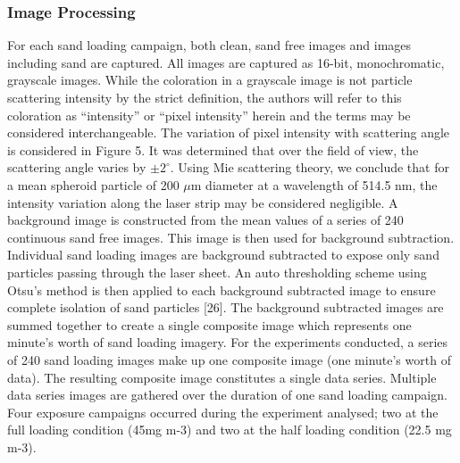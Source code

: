 \documentclass[12pt]{iopart}
\begin{document}
\subsubsection{Image Processing}
For each sand loading campaign, both clean, sand free images and images including sand are captured. All images are captured as 16-bit, monochromatic, grayscale images. While the coloration in a grayscale image is not particle scattering intensity by the strict definition, the authors will refer to this coloration as “intensity” or “pixel intensity” herein and the terms may be considered interchangeable. The variation of pixel intensity with scattering angle is considered in Figure 5. It was determined that over the field of view, the scattering angle varies by $\pm2^\circ$. Using Mie scattering theory, we conclude that for a mean spheroid particle of 200 $\mu$m diameter at a wavelength of 514.5 nm, the intensity variation along the laser strip may be considered negligible.
A background image is constructed from the mean values of a series of 240 continuous sand free images. This image is then used for background subtraction. Individual sand loading images are background subtracted to expose only sand particles passing through the laser sheet. An auto thresholding scheme using Otsu’s method is then applied to each background subtracted image to ensure complete isolation of sand particles [26]. The background subtracted images are summed together to create a single composite image which represents one minute’s worth of sand loading imagery. For the experiments conducted, a series of 240 sand loading images make up one composite image (one minute’s worth of data). The resulting composite image constitutes a single data series. Multiple data series images are gathered over the duration of one sand loading campaign. Four exposure campaigns occurred during the experiment analysed; two at the full loading condition (45mg m-3) and two at the half loading condition (22.5 mg m-3).  



\end{document}
